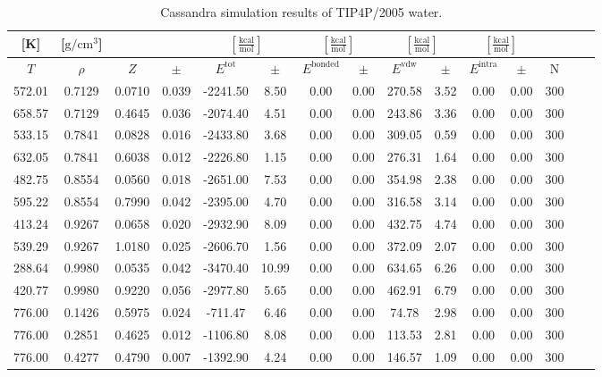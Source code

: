 \documentclass[%
 aip,
 jcp,
 sd,%
 amsmath,amssymb,
]{revtex4-1}
\begin{document}
\begin{table*}[!htbp]
\centering
\caption{Cassandra simulation results of TIP4P/2005 water.}
\label{tab:NIST-VAL-C12-FTT}
\begin{ruledtabular}
\begin{tabular}{ccccccccccccccc}
[K] & [$\mathrm{g/cm^3}$] &  &  & \multicolumn{2}{c}{$[\frac{\mathrm{kcal}}{\mathrm{mol}}]$} & \multicolumn{2}{c}{$[\frac{\mathrm{kcal}}{\mathrm{mol}}]$} & \multicolumn{2}{c}{$[\frac{\mathrm{kcal}}{\mathrm{mol}}]$} &\multicolumn{2}{c}{$[\frac{\mathrm{kcal}}{\mathrm{mol}}]$} & \\
\hline
$T$ & $\rho$ & $Z$ & $\pm$ & $E^{\mathrm{tot}}$ & $\pm$ & $E^{\mathrm{bonded}}$ & $\pm$ & $E^{\mathrm{vdw}}$ & $\pm$ & $E^{\mathrm{intra}}$ & $\pm$ & N\\
\hline
572.01	&	0.7129	&	0.0710	&	0.039	&	-2241.50	&	8.50	&	0.00	&	0.00	&	270.58	&	3.52	&	0.00	&	0.00	&	300	\\
658.57	&	0.7129	&	0.4645	&	0.036	&	-2074.40	&	4.51	&	0.00	&	0.00	&	243.86	&	3.36	&	0.00	&	0.00	&	300	\\
533.15	&	0.7841	&	0.0828	&	0.016	&	-2433.80	&	3.68	&	0.00	&	0.00	&	309.05	&	0.59	&	0.00	&	0.00	&	300	\\
632.05	&	0.7841	&	0.6038	&	0.012	&	-2226.80	&	1.15	&	0.00	&	0.00	&	276.31	&	1.64	&	0.00	&	0.00	&	300	\\
482.75	&	0.8554	&	0.0560	&	0.018	&	-2651.00	&	7.53	&	0.00	&	0.00	&	354.98	&	2.38	&	0.00	&	0.00	&	300	\\
595.22	&	0.8554	&	0.7990	&	0.042	&	-2395.00	&	4.70	&	0.00	&	0.00	&	316.58	&	3.14	&	0.00	&	0.00	&	300	\\
413.24	&	0.9267	&	0.0658	&	0.020	&	-2932.90	&	8.09	&	0.00	&	0.00	&	432.75	&	4.74	&	0.00	&	0.00	&	300	\\
539.29	&	0.9267	&	1.0180	&	0.025	&	-2606.70	&	1.56	&	0.00	&	0.00	&	372.09	&	2.07	&	0.00	&	0.00	&	300	\\
288.64	&	0.9980	&	0.0535	&	0.042	&	-3470.40	&	10.99	&	0.00	&	0.00	&	634.65	&	6.26	&	0.00	&	0.00	&	300	\\
420.77	&	0.9980	&	0.9220	&	0.056	&	-2977.80	&	5.65	&	0.00	&	0.00	&	462.91	&	6.79	&	0.00	&	0.00	&	300	\\
776.00	&	0.1426	&	0.5975	&	0.024	&	-711.47	&	6.46	&	0.00	&	0.00	&	74.78	&	2.98	&	0.00	&	0.00	&	300	\\
776.00	&	0.2851	&	0.4625	&	0.012	&	-1106.80	&	8.08	&	0.00	&	0.00	&	113.53	&	2.81	&	0.00	&	0.00	&	300	\\
776.00	&	0.4277	&	0.4790	&	0.007	&	-1392.90	&	4.24	&	0.00	&	0.00	&	146.57	&	1.09	&	0.00	&	0.00	&	300	\\

\end{tabular}
\end{ruledtabular}
\end{table*}
\end{document}
